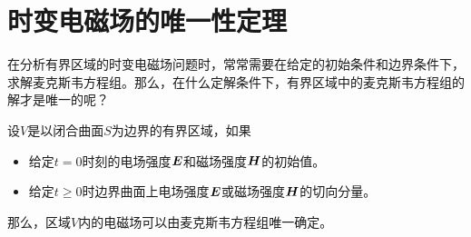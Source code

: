 \section{时变电磁场的唯一性定理}
在分析有界区域的时变电磁场问题时，常常需要在给定的初始条件和边界条件下，求解麦克斯韦方程组。那么，在什么定解条件下，有界区域中的麦克斯韦方程组的解才是唯一的呢？
\begin{BoxTheorem}[时变电磁场的唯一性定理]
    设$V$是以闭合曲面$S$为边界的有界区域，如果
    \begin{itemize}
        \item 给定$t=0$时刻的电场强度$\vb*{E}$和磁场强度$\vb*{H}$的初始值。
        \item 给定$t\geq 0$时边界曲面上电场强度$\vb*{E}$或磁场强度$\vb*{H}$的切向分量。
    \end{itemize}
    那么，区域$V$内的电磁场可以由麦克斯韦方程组唯一确定。
\end{BoxTheorem}

